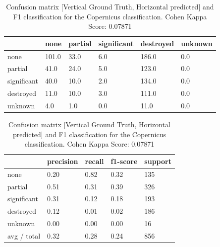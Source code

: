 \begin{table} [H]
	\footnotesize
	\captionsetup{justification=raggedright,singlelinecheck=false}
	\caption{Confusion matrix [Vertical Ground Truth, Horizontal predicted] and F1 classification for the Copernicus classification. Cohen Kappa Score: 0.07871 }
	\begin{tabular}{l|lllll}		
		& none  & partial & significant & destroyed & unknown \\\hline
none        & 101.0 & 33.0    & 6.0         & 186.0     & 0.0     \\
partial     & 41.0  & 24.0    & 5.0         & 123.0     & 0.0     \\
significant & 40.0  & 10.0    & 2.0         & 134.0     & 0.0     \\
destroyed   & 11.0  & 10.0    & 3.0         & 111.0     & 0.0     \\
unknown     & 4.0   & 1.0     & 0.0         & 11.0      & 0.0    
	\end{tabular}
	\begin{tabular}{l|llll}
            & precision & recall & f1-score & support \\\hline
none        & 0.20      & 0.82   & 0.32     & 135     \\
partial     & 0.51      & 0.31   & 0.39     & 326     \\
significant & 0.31      & 0.12   & 0.18     & 193     \\
destroyed   & 0.12      & 0.01   & 0.02     & 186     \\
unknown     & 0.00      & 0.00   & 0.00     & 16      \\
avg / total & 0.32      & 0.28   & 0.24     & 856  \\  
	\end{tabular}
	\label{tab:matCop2}
\end{table}

